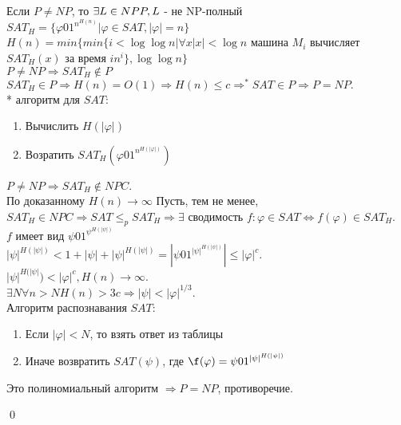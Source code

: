 \documentclass{article}
\begin{document}
	\begin{theorem}[<Ландер>]
		Если $P \not = NP$, то $\exists L \in NP\\P, L $ - не NP-полный
		\proof
		$SAT_H = \{\varphi 01^{n^{H(n)}} | \varphi \in SAT, |\varphi| = n \}$
		\\ $H(n) = min\{min\{i < \log\log n | \forall x |x| < \log n$ машина $M_i$ вычисляет $SAT_H(x)$ за время $in^i\}, \log\log n\}$\\
		$P \not = NP \Rightarrow SAT_H \not\in P$\\
		$SAT_H \in P \Rightarrow H(n) = O(1) \Rightarrow H(n) \le c \Rightarrow^* SAT \in P \Rightarrow P=NP.$	\\
		* алгоритм для $SAT:$
		\begin{enumerate}
			\item Вычислить $H(|\varphi|)$
			\item Возратить $SAT_H(\varphi 01^{n^{H(|\varphi|)}})$
		\end{enumerate}
		
		$P\not = NP \Rightarrow SAT_H \not\in NPC$. \\
		По доказанному $H(n)\to\infty$
		Пусть, тем не менее, $SAT_H\in NPC \Rightarrow SAT \le_p SAT_H \Rightarrow \exists$ сводимость $f: \varphi\in SAT \Leftrightarrow f(\varphi)\in SAT_H.$\\
		$f$  имеет вид $\psi01^{{\psi}^{H(|\psi|)}}$\\
		$|\psi|^{H(|\psi|)} < 1 + |\psi| + |\psi|^{H(|\psi|)} = |\psi01^{|\psi|^{H(|\psi|)}}| \le |\varphi|^c$.\\
		$|\psi|^{H(|\psi|}) < |\varphi|^c, H(n)\to\infty$.\\
		$\exists N \forall n > N H(n) > 3c \Rightarrow |\psi| < |\varphi|^{1/3}.$\\
		Алгоритм распознавания $SAT:$
		\begin{enumerate}
			\item Если $|\varphi| < N$, то взять ответ из таблицы
			\item Иначе возвратить $SAT(\psi)$, где $\f(\varphi) = \psi01^{|\psi|^{H(|\psi|)}}$
		\end{enumerate}		
		Это полиномиальный алгоритм $\Rightarrow P=NP$, противоречие.
	\end{theorem}
	\qed
	
	
\end{document}
